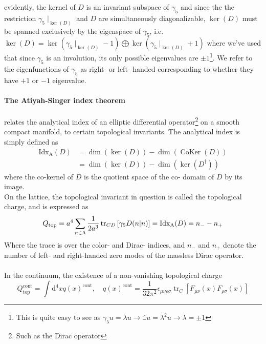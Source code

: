 \documentclass[a4paper,10pt]{book}
\begin{document}
evidently, the kernel of $D$ is an invariant subspace of $\gamma_5$ and since the the restriction $\gamma_5\mid_{\operatorname{ker}(D)}$ and $D$ are simultaneously diagonalizable, $\operatorname{ker}(D)$ must be spanned exclusively by the eigenspace of $\gamma_5$, i.e. $\operatorname{ker}(D) = \operatorname{ker}\left( \gamma_5\mid_{\operatorname{ker}(D)} -1 \right) \bigoplus\operatorname{ker}\left( \gamma_5\mid_{\operatorname{ker}(D)} +1 \right)$ where we've used that since $\gamma_5$ is an involution, its only possible eigenvalues are $\pm1$\footnote{This is quite easy to see as $\gamma_5 u = \lambda u\rightarrow \mathbb{1} u = \lambda^2 u\rightarrow \lambda=\pm1$}. We refer to the eigenfunctions of $\gamma_5$ as right- or left- handed corresponding to whether they have $+1$ or $-1$ eigenvalue.\paragraph{The Atiyah-Singer index theorem} relates the analytical index of an elliptic differential operator\footnote{Such as the Dirac operator} on a smooth compact manifold, to certain topological invariants. The analytical index is simply defined as
\begin{equation}
\begin{aligned} 
\operatorname{Idx_A}(D) &= \operatorname{dim}(\operatorname{ker}(D))-\operatorname{dim}(\operatorname{CoKer}(D))\\&= \operatorname{dim}(\operatorname{ker}(D))-\operatorname{dim}(\operatorname{ker}(D^\dagger))
\end{aligned} 
\end{equation}
where the co-kernel of $D$ is the quotient space of the co- domain of $D$ by its image.\\On the lattice, the topological invariant in question is called the topological charge, and is expressed as 
\begin{equation}\label{eq:topCharge_DiracOperator_index}
Q_{\mathrm{top}}=a^{4} \sum_{n \in \Lambda} \frac{1}{2 a^{3}} \operatorname{tr}_{C D}\left[\gamma_{5} D(n\mkern-5mu\mid\mkern-5mu n)\right]=\operatorname{Idx_A}(D)=n_{-}-n_{+}
\end{equation}
Where the trace is over the color- and Dirac- indices, and $n_-$ and $n_+$ denote the number of left- and right-handed zero modes of the massless Dirac operator.\\\\In the continuum, the existence of a non-vanishing topological charge
\begin{equation}\label{eq:topological_charge_continuum}
Q_{\mathrm{top}}^{\mathrm{cont}}=\int \mathrm{d}^{4} x q(x)^{\mathrm{cont}}, \quad q(x)^{\mathrm{cont}}=\frac{1}{32 \pi^{2}} \epsilon_{\mu \nu \rho \sigma} \operatorname{tr}_{C}\left[F_{\mu \nu}(x) F_{\rho \sigma}(x)\right]
\end{equation}
\end{document}
